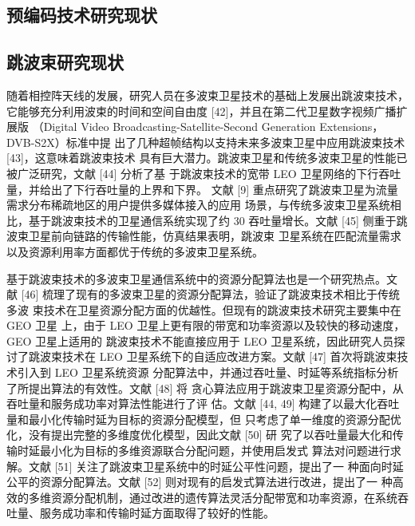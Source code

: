 \subsection{预编码技术研究现状}

\subsection{跳波束研究现状}
随着相控阵天线的发展，研究人员在多波束卫星技术的基础上发展出跳波束技术，
它能够充分利用波束的时间和空间自由度 [42]，并且在第二代卫星数字视频广播扩展版
（Digital Video Broadcasting-Satellite-Second Generation Extensions，DVB-S2X）标准中提
出了几种超帧结构以支持未来多波束卫星中应用跳波束技术 [43]，这意味着跳波束技术
具有巨大潜力。跳波束卫星和传统多波束卫星的性能已被广泛研究，文献 [44] 分析了基
于跳波束技术的宽带 LEO 卫星网络的下行吞吐量，并给出了下行吞吐量的上界和下界。
文献 [9] 重点研究了跳波束卫星为流量需求分布稀疏地区的用户提供多媒体接入的应用
场景，与传统多波束卫星系统相比，基于跳波束技术的卫星通信系统实现了约 30%
吞吐量增长。文献 [45] 侧重于跳波束卫星前向链路的传输性能，仿真结果表明，跳波束
卫星系统在匹配流量需求以及资源利用率方面都优于传统的多波束卫星系统。\par

基于跳波束技术的多波束卫星通信系统中的资源分配算法也是一个研究热点。文
献 [46] 梳理了现有的多波束卫星的资源分配算法，验证了跳波束技术相比于传统多波
束技术在卫星资源分配方面的优越性。但现有的跳波束技术研究主要集中在 GEO 卫星
上，由于 LEO 卫星上更有限的带宽和功率资源以及较快的移动速度，GEO 卫星上适用的
跳波束技术不能直接应用于 LEO 卫星系统，因此研究人员探讨了跳波束技术在 LEO
卫星系统下的自适应改进方案。文献 [47] 首次将跳波束技术引入到 LEO 卫星系统资源
分配算法中，并通过吞吐量、时延等系统指标分析了所提出算法的有效性。文献 [48] 将
贪心算法应用于跳波束卫星资源分配中，从吞吐量和服务成功率对算法性能进行了评
估。文献 [44, 49] 构建了以最大化吞吐量和最小化传输时延为目标的资源分配模型，但
只考虑了单一维度的资源分配优化，没有提出完整的多维度优化模型，因此文献 [50] 研
究了以吞吐量最大化和传输时延最小化为目标的多维资源联合分配问题，并使用启发式
算法对问题进行求解。文献 [51] 关注了跳波束卫星系统中的时延公平性问题，提出了一
种面向时延公平的资源分配算法。文献 [52] 则对现有的启发式算法进行改进，提出了一
种高效的多维资源分配机制，通过改进的遗传算法灵活分配带宽和功率资源，在系统吞
吐量、服务成功率和传输时延方面取得了较好的性能。\par

